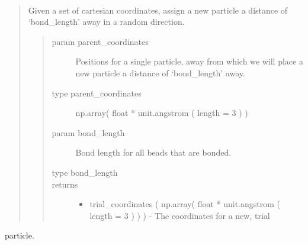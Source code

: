 \documentclass[letterpaper,12pt,english,openany,oneside]{sphinxmanual}
\begin{document}
\begin{fulllineitems}
\label{\detokenize{utilities:utilities.util.attempt_move}}~\begin{quote}

Given a set of cartesian coordinates, assign a new particle
a distance of ‘bond\_length’ away in a random direction.
\begin{quote}\begin{description}
\item[{param parent\_coordinates}] \leavevmode
Positions for a single particle, away from which we will place a new particle a distance of ‘bond\_length’ away.

\item[{type parent\_coordinates}] \leavevmode
np.array( float * unit.angstrom ( length = 3 ) )

\item[{param bond\_length}] \leavevmode
Bond length for all beads that are bonded.

\item[{type bond\_length}] \leavevmode
{}

\item[{returns}] \leavevmode\begin{itemize}
\item {} 
trial\_coordinates ( np.array( float * unit.angstrom ( length = 3 ) ) ) - The coordinates for a new, trial

\end{itemize}

\end{description}\end{quote}
\end{quote}

particle.

\end{fulllineitems}

\end{document}
